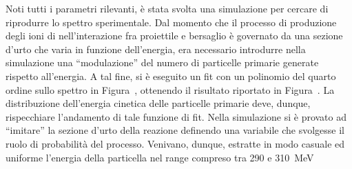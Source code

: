 Noti tutti i parametri rilevanti, è stata svolta una simulazione per cercare di riprodurre lo spettro sperimentale. 
Dal momento che il processo di produzione degli ioni di  nell'interazione fra proiettile e bersaglio è governato da una sezione d'urto che varia in funzione dell'energia, era necessario introdurre nella simulazione una ``modulazione'' del numero di particelle primarie generate rispetto all'energia.
A tal fine, si è eseguito un fit con un polinomio del quarto ordine sullo spettro in Figura~, ottenendo il risultato riportato in Figura~.
La distribuzione dell'energia cinetica delle particelle primarie deve, dunque, rispecchiare l'andamento di tale funzione di fit.
Nella simulazione si è provato ad ``imitare'' la sezione d'urto della reazione definendo una variabile che svolgesse il ruolo di probabilità del processo.
Venivano, dunque, estratte in modo casuale ed uniforme l'energia della particella nel range compreso tra 290 e 310~MeV 

